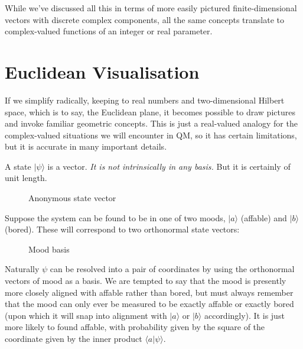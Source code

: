 While we've discussed all this in terms of more easily pictured finite-dimensional vectors with discrete complex components, all the same concepts translate to complex-valued functions of an integer or real parameter.

\section{Euclidean Visualisation}

If we simplify radically, keeping to real numbers and two-dimensional Hilbert space, which is to say, the Euclidean plane, it becomes possible to draw pictures and invoke familiar geometric concepts. This is just a real-valued analogy for the complex-valued situations we will encounter in QM, so it has certain limitations, but it is accurate in many important details.

A state $|\psi\rangle$ is a vector. \textit{It is not intrinsically in any basis.} But it is certainly of unit length.

\begin{figure}[h]
  \centering
  \centering
  \caption{Anonymous state vector} \label{fig:state-vector}
\end{figure}

Suppose the system can be found to be in one of two moods, $|a\rangle$ (affable) and $|b\rangle$ (bored). These will correspond to two orthonormal state vectors:

\begin{figure}[h]
  \centering
  \centering
  \caption{Mood basis} \label{fig:mood-basis}
\end{figure}

Naturally $\psi$ can be resolved into a pair of coordinates by using the orthonormal vectors of mood as a basis. We are tempted to say that the mood is presently more closely aligned with affable rather than bored, but must always remember that the mood can only ever be measured to be exactly affable or exactly bored (upon which it will snap into alignment with $|a\rangle$ or $|b\rangle$ accordingly). It is just more likely to found affable, with probability given by the square of the coordinate given by the inner product $\langle a|\psi \rangle$.

